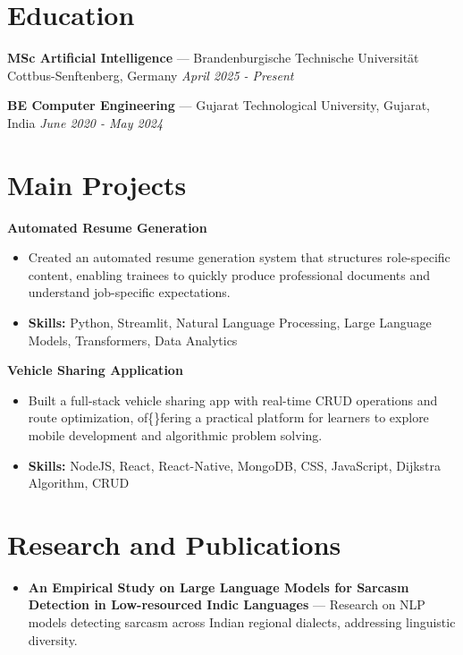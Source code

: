 \documentclass[a4paper,10pt]{article}
\begin{document}
\section*{Education}
\textbf{MSc Artificial Intelligence} — Brandenburgische Technische Universität Cottbus-Senftenberg, Germany \hfill \textit{April 2025 - Present}\par
\vspace{1.5pt}
\textbf{BE Computer Engineering} — Gujarat Technological University, Gujarat, India \hfill \textit{June 2020 - May 2024}\par

\section*{Main Projects}
\textbf{Automated Resume Generation}\par
\vspace{1pt}
\begin{itemize}
  \item Created an automated resume generation system that structures role-specific content, enabling trainees to quickly produce professional documents and understand job-specific expectations.
  \item \textbf{Skills:} Python, Streamlit, Natural Language Processing, Large Language Models, Transformers, Data Analytics
\end{itemize}
\vspace{3pt}
\textbf{Vehicle Sharing Application}\par
\vspace{1pt}
\begin{itemize}
  \item Built a full-stack vehicle sharing app with real-time CRUD operations and route optimization, of\{\}fering a practical platform for learners to explore mobile development and algorithmic problem solving.
  \item \textbf{Skills:} NodeJS, React, React-Native, MongoDB, CSS, JavaScript, Dijkstra Algorithm, CRUD
\end{itemize}

\section*{Research and Publications}
\begin{itemize}
\item \textbf{An Empirical Study on Large Language Models for Sarcasm Detection in Low-resourced Indic Languages} — Research on NLP models detecting sarcasm across Indian regional dialects, addressing linguistic diversity.
\end{itemize}
\end{document}
